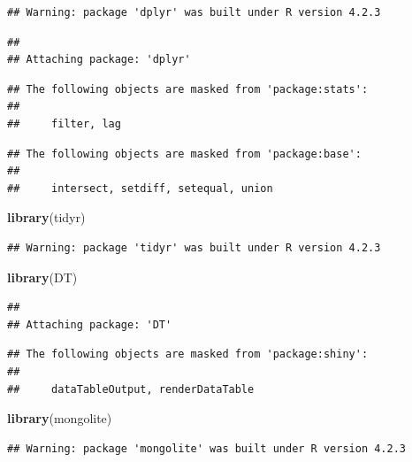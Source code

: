 \documentclass[
]{article}
\newenvironment{Shaded}{\begin{snugshade}}{\end{snugshade}}
\newcommand{\FunctionTok}[1]{\textcolor[rgb]{0.13,0.29,0.53}{\textbf{#1}}}
\newcommand{\NormalTok}[1]{#1}
\begin{document}
\begin{verbatim}
## Warning: package 'dplyr' was built under R version 4.2.3
\end{verbatim}

\begin{verbatim}
## 
## Attaching package: 'dplyr'
\end{verbatim}

\begin{verbatim}
## The following objects are masked from 'package:stats':
## 
##     filter, lag
\end{verbatim}

\begin{verbatim}
## The following objects are masked from 'package:base':
## 
##     intersect, setdiff, setequal, union
\end{verbatim}

\begin{Shaded}
\begin{Highlighting}[]
\FunctionTok{library}\NormalTok{(tidyr)}
\end{Highlighting}
\end{Shaded}

\begin{verbatim}
## Warning: package 'tidyr' was built under R version 4.2.3
\end{verbatim}

\begin{Shaded}
\begin{Highlighting}[]
\FunctionTok{library}\NormalTok{(DT)}
\end{Highlighting}
\end{Shaded}

\begin{verbatim}
## 
## Attaching package: 'DT'
\end{verbatim}

\begin{verbatim}
## The following objects are masked from 'package:shiny':
## 
##     dataTableOutput, renderDataTable
\end{verbatim}

\begin{Shaded}
\begin{Highlighting}[]
\FunctionTok{library}\NormalTok{(mongolite)}
\end{Highlighting}
\end{Shaded}

\begin{verbatim}
## Warning: package 'mongolite' was built under R version 4.2.3
\end{verbatim}
\end{document}
